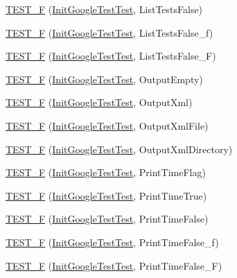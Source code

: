 \begin{DoxyCompactItemize}
\item 
\hyperlink{namespacetesting_acc2334b947370b550b7d6241e0d34124}{T\+E\+S\+T\+\_\+F} (\hyperlink{classtesting_1_1InitGoogleTestTest}{Init\+Google\+Test\+Test}, List\+Tests\+False)
\item 
\hyperlink{namespacetesting_a60e2b7e1cf88c2af6e04055b3afe7cbe}{T\+E\+S\+T\+\_\+F} (\hyperlink{classtesting_1_1InitGoogleTestTest}{Init\+Google\+Test\+Test}, List\+Tests\+False\+\_\+f)
\item 
\hyperlink{namespacetesting_a4933b012108ecb88243c2dbc13d7665b}{T\+E\+S\+T\+\_\+F} (\hyperlink{classtesting_1_1InitGoogleTestTest}{Init\+Google\+Test\+Test}, List\+Tests\+False\+\_\+F)
\item 
\hyperlink{namespacetesting_a121894d4edf72b1dbabdcde2bebd745d}{T\+E\+S\+T\+\_\+F} (\hyperlink{classtesting_1_1InitGoogleTestTest}{Init\+Google\+Test\+Test}, Output\+Empty)
\item 
\hyperlink{namespacetesting_a90df70c45f67d4c0dbc5bd29f7be3361}{T\+E\+S\+T\+\_\+F} (\hyperlink{classtesting_1_1InitGoogleTestTest}{Init\+Google\+Test\+Test}, Output\+Xml)
\item 
\hyperlink{namespacetesting_a810f99da1185404f8a899c919ee6433e}{T\+E\+S\+T\+\_\+F} (\hyperlink{classtesting_1_1InitGoogleTestTest}{Init\+Google\+Test\+Test}, Output\+Xml\+File)
\item 
\hyperlink{namespacetesting_ac351c3065ee89f7eb2fbba809db5c61d}{T\+E\+S\+T\+\_\+F} (\hyperlink{classtesting_1_1InitGoogleTestTest}{Init\+Google\+Test\+Test}, Output\+Xml\+Directory)
\item 
\hyperlink{namespacetesting_aa832ff8ffe6b687c7025cbc766973e0b}{T\+E\+S\+T\+\_\+F} (\hyperlink{classtesting_1_1InitGoogleTestTest}{Init\+Google\+Test\+Test}, Print\+Time\+Flag)
\item 
\hyperlink{namespacetesting_ae0f76bbca8e2bf7d9de60c4b8b0dfa16}{T\+E\+S\+T\+\_\+F} (\hyperlink{classtesting_1_1InitGoogleTestTest}{Init\+Google\+Test\+Test}, Print\+Time\+True)
\item 
\hyperlink{namespacetesting_a1ec71efef2639ccb137ac5b7ccd8c9d1}{T\+E\+S\+T\+\_\+F} (\hyperlink{classtesting_1_1InitGoogleTestTest}{Init\+Google\+Test\+Test}, Print\+Time\+False)
\item 
\hyperlink{namespacetesting_af87ac7e6dc7c0ea1d85eaa3a57358d29}{T\+E\+S\+T\+\_\+F} (\hyperlink{classtesting_1_1InitGoogleTestTest}{Init\+Google\+Test\+Test}, Print\+Time\+False\+\_\+f)
\item 
\hyperlink{namespacetesting_a337ddb6629adb42219e612b67d18c6f1}{T\+E\+S\+T\+\_\+F} (\hyperlink{classtesting_1_1InitGoogleTestTest}{Init\+Google\+Test\+Test}, Print\+Time\+False\+\_\+F)

\end{DoxyCompactItemize}
